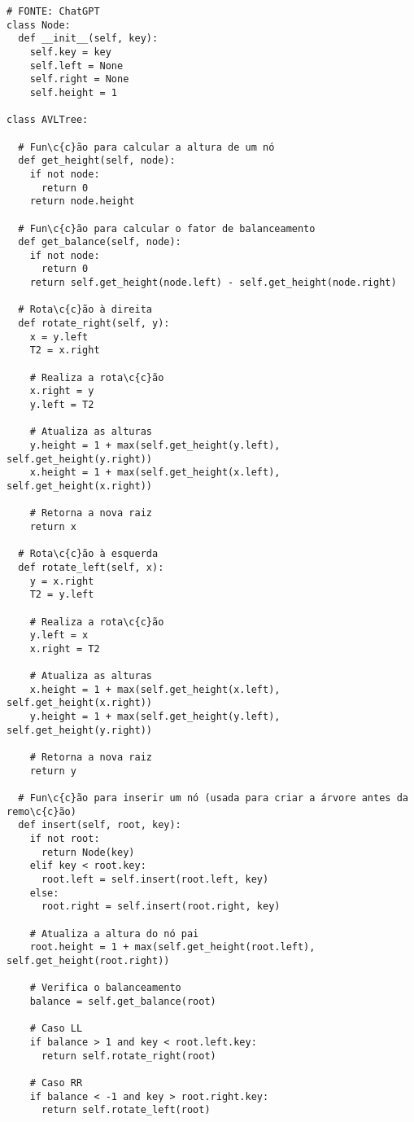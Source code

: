 \documentclass{article}
\begin{document}
\begin{lstlisting}
# FONTE: ChatGPT
class Node:
  def __init__(self, key):
    self.key = key
    self.left = None
    self.right = None
    self.height = 1

class AVLTree:
    
  # Fun\c{c}ão para calcular a altura de um nó
  def get_height(self, node):
    if not node:
      return 0
    return node.height

  # Fun\c{c}ão para calcular o fator de balanceamento
  def get_balance(self, node):
    if not node:
      return 0
    return self.get_height(node.left) - self.get_height(node.right)

  # Rota\c{c}ão à direita
  def rotate_right(self, y):
    x = y.left
    T2 = x.right

    # Realiza a rota\c{c}ão
    x.right = y
    y.left = T2

    # Atualiza as alturas
    y.height = 1 + max(self.get_height(y.left), self.get_height(y.right))
    x.height = 1 + max(self.get_height(x.left), self.get_height(x.right))

    # Retorna a nova raiz
    return x

  # Rota\c{c}ão à esquerda
  def rotate_left(self, x):
    y = x.right
    T2 = y.left

    # Realiza a rota\c{c}ão
    y.left = x
    x.right = T2

    # Atualiza as alturas
    x.height = 1 + max(self.get_height(x.left), self.get_height(x.right))
    y.height = 1 + max(self.get_height(y.left), self.get_height(y.right))

    # Retorna a nova raiz
    return y

  # Fun\c{c}ão para inserir um nó (usada para criar a árvore antes da remo\c{c}ão)
  def insert(self, root, key):
    if not root:
      return Node(key)
    elif key < root.key:
      root.left = self.insert(root.left, key)
    else:
      root.right = self.insert(root.right, key)

    # Atualiza a altura do nó pai
    root.height = 1 + max(self.get_height(root.left), self.get_height(root.right))

    # Verifica o balanceamento
    balance = self.get_balance(root)

    # Caso LL
    if balance > 1 and key < root.left.key:
      return self.rotate_right(root)

    # Caso RR
    if balance < -1 and key > root.right.key:
      return self.rotate_left(root)


\end{lstlisting}
\end{document}
